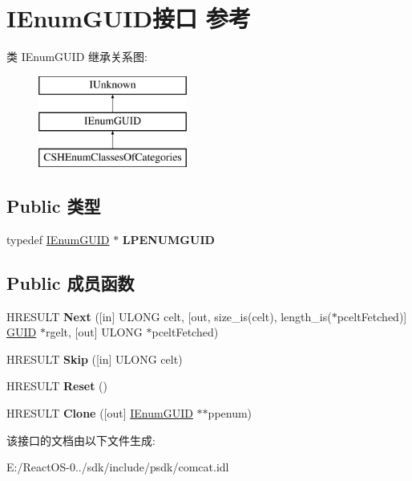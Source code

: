 \hypertarget{interface_i_enum_g_u_i_d}{}\section{I\+Enum\+G\+U\+I\+D接口 参考}
\label{interface_i_enum_g_u_i_d}
类 I\+Enum\+G\+U\+ID 继承关系图\+:\begin{figure}[H]
\begin{center}
\leavevmode
\includegraphics[height=3.000000cm]{interface_i_enum_g_u_i_d}
\end{center}
\end{figure}
\subsection*{Public 类型}
\begin{DoxyCompactItemize}
\item 
\mbox{\label{interface_i_enum_g_u_i_d_a31198431fa15bcac918a70c85d62c1c8}} 
typedef \hyperlink{interface_i_enum_g_u_i_d}{I\+Enum\+G\+U\+ID} $\ast$ {\bfseries L\+P\+E\+N\+U\+M\+G\+U\+ID}
\end{DoxyCompactItemize}
\subsection*{Public 成员函数}
\begin{DoxyCompactItemize}
\item 
\mbox{\label{interface_i_enum_g_u_i_d_a801f78c7c0e93539f84216e237e03641}} 
H\+R\+E\+S\+U\+LT {\bfseries Next} (\mbox{[}in\mbox{]} U\+L\+O\+NG celt, \mbox{[}out, size\+\_\+is(celt), length\+\_\+is($\ast$pcelt\+Fetched)\mbox{]} \hyperlink{interface_g_u_i_d}{G\+U\+ID} $\ast$rgelt, \mbox{[}out\mbox{]} U\+L\+O\+NG $\ast$pcelt\+Fetched)
\item 
\mbox{\label{interface_i_enum_g_u_i_d_a6a34ef1247cb3c627855735afba97500}} 
H\+R\+E\+S\+U\+LT {\bfseries Skip} (\mbox{[}in\mbox{]} U\+L\+O\+NG celt)
\item 
\mbox{\label{interface_i_enum_g_u_i_d_ad8bfa22972a59d283b2f16b129c152df}} 
H\+R\+E\+S\+U\+LT {\bfseries Reset} ()
\item 
\mbox{\label{interface_i_enum_g_u_i_d_aa19700f47ec580c71f0b8dd3afb3488e}} 
H\+R\+E\+S\+U\+LT {\bfseries Clone} (\mbox{[}out\mbox{]} \hyperlink{interface_i_enum_g_u_i_d}{I\+Enum\+G\+U\+ID} $\ast$$\ast$ppenum)
\end{DoxyCompactItemize}


该接口的文档由以下文件生成\+:\begin{DoxyCompactItemize}
\item 
E\+:/\+React\+O\+S-\/0../sdk/include/psdk/comcat.\+idl\end{DoxyCompactItemize}
